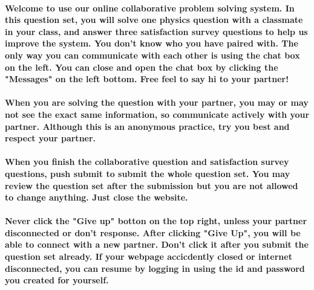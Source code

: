 \paragraph{Welcome to use our online collaborative problem solving system. In this question set, you will solve one physics question with a classmate in your class, and answer three satisfaction survey questions to help us improve the system. You don't know who you have paired with. The only way you can communicate with each other is using the chat box on the left. You can close and open the chat box by clicking the "Messages" on the left bottom. Free feel to say hi to your partner!\newline}

\paragraph{When you are solving the question with your partner, you may or may not see the exact same information, so communicate actively with your partner. Although this is an anonymous practice, try you best and respect your partner.\newline}

\paragraph{When you finish the collaborative question and satisfaction survey questions, push submit to submit the whole question set. You may review the question set after the submission but you are not allowed to change anything. Just close the website.\newline}

\paragraph{Never click the "Give up" botton on the top right, unless your partner disconnected or don't response. After clicking "Give Up", you will be able to connect with a new partner. Don't click it after you submit the question set already. If your webpage accicdently closed or internet disconnected, you can resume by logging in using the id and password you created for yourself.\newline}